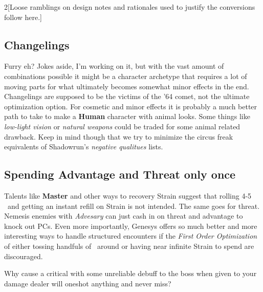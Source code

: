 \documentclass{book}
\begin{document}
\begin{multicols}{2}[Loose ramblings on design notes and rationales used to justify the conversions follow here.]
\subsection{Changelings}
Furry eh? Jokes aside, I'm working on it, but with the vast amount of combinations possible it might be a character archetype that requires a lot of moving parts for what ultimately becomes somewhat minor effects in the end. Changelings are supposed to be the victims of the '64 comet, not the ultimate optimization option. For cosmetic and minor effects it is probably a much better path to take to make a \textbf{Human} character with animal looks. Some things like \textit{low-light vision} or \textit{natural weapons} could be traded for some animal related drawback. Keep in mind though that we try to minimize the circus freak equivalents of Shadowrun's \textit{negative qualitues} lists. 

\subsection{Spending  Advantage and Threat only once}
Talents like \textbf{Master} and other ways to recovery Strain suggest that rolling 4-5 \Advantage\ and getting an instant refill on Strain is not intended. The same goes for threat. Nemesis enemies with \textit{Advesary} can just cash in on threat and advantage to knock out PCs. Even more importantly, Genesys offers so much better and more interesting ways to handle structured encounters if the \textit{First Order Optimization} of either tossing handfuls of \BoostDie\ around or having near infinite Strain to spend are discouraged. 

Why cause a critical with some unreliable debuff to the boss when \mbox{\BoostDie \BoostDie \BoostDie \BoostDie \BoostDie} given to your damage dealer will oneshot anything and never miss? 

\hfill{}

\end{multicols}
\end{document}

